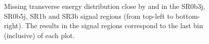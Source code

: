 \documentclass[UKenglish,texlive=2013]{\ATLASLATEXPATH atlasdoc}
\begin{document}
\begin{figure}[h!]
\centering
{}
\caption{Missing transverse energy distribution close by and in the SR0b3j, SR0b5j, SR1b and SR3b signal regions (from top-left to bottom-right). The results in the signal regions correspond to the last bin (inclusive) of each plot.}
\label{fig:Results_SR_metD}
\end{figure}  
\end{document}
